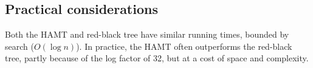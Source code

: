 \subsection{Practical considerations}
Both the HAMT and red-black tree have similar running times, bounded by search ($O(\log n)$).
In practice, the HAMT often outperforms the red-black tree, partly because of the log factor of 32, but at a cost of space and complexity.


